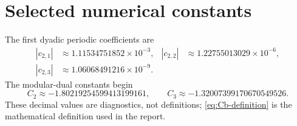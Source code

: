 \documentclass[11pt]{article}
\theoremstyle{definition}
\theoremstyle{remark}
\begin{document}
\section{Selected numerical constants}

The first dyadic periodic coefficients are
\[
\begin{aligned}
 |c_{2,1}|&\approx1.11534751852\times10^{-3},&
 |c_{2,2}|&\approx1.22755013029\times10^{-6},\\
 |c_{2,3}|&\approx1.06068491216\times10^{-9}.&&
\end{aligned}
\]
The modular-dual constants begin
\[
 C_2\approx-1.80219254599413199161,
 \qquad
 C_3\approx-1.32007399170670549526.
\]
These decimal values are diagnostics, not definitions; \eqref{eq:Cb-definition} is the mathematical definition used in the report.
\end{document}
